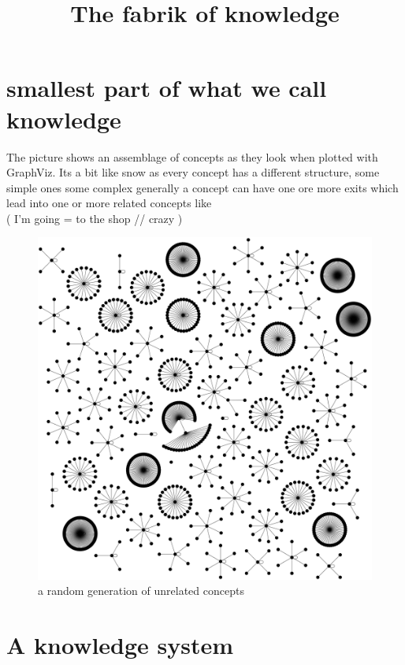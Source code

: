 \documentclass[11pt]{article}
\title{\textbf{The fabrik of knowledge}}
\begin{document}
\maketitle


\section{smallest part of what we call knowledge}
The picture shows an assemblage of concepts as they look when plotted with GraphViz.
Its a bit like snow as every concept has a different structure,
some simple ones some complex generally a concept can have one ore more 
exits which lead into one or more related concepts like\\
( I'm going = to the shop // crazy )



\begin{figure}[htp]
\includegraphics[scale=0.10]{img/w_directories.png}
\caption{a random generation of unrelated concepts}
\label{}
\end{figure}




\section{A knowledge system }
\end{document}
